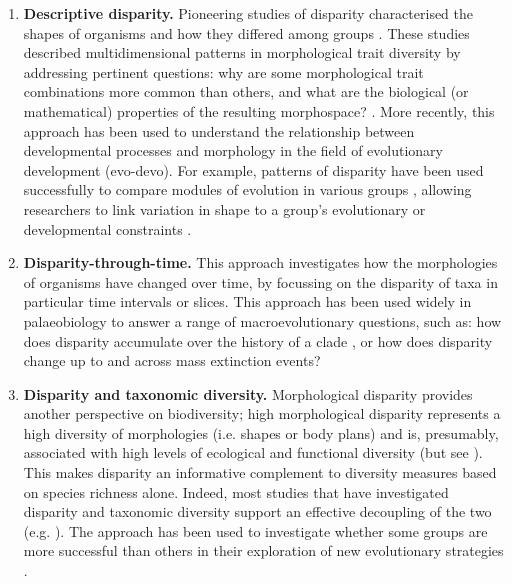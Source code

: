 \documentclass[12pt,letterpaper]{article}
\begin{document}
\begin{enumerate}

	\item \textbf{Descriptive disparity.} Pioneering studies of disparity characterised the shapes of organisms and how they differed among groups \citep{Foote1995, Briggs1992}.
	These studies described multidimensional patterns in morphological trait diversity by addressing pertinent questions: why are some morphological trait combinations more common than others, and what are the biological (or mathematical) properties of the resulting morphospace? \citep{Foote1995, Raup1961, Gerber2017}.
	More recently, this approach has been used to understand the relationship between developmental processes and morphology in the field of evolutionary development (evo-devo).
	For example, patterns of disparity have been used successfully to compare modules of evolution in various groups \citep{goswami2010influence,bardua2019morphological}, allowing researchers to link variation in shape to a group's evolutionary or developmental constraints \citep{Hipsley2017}.

	\item \textbf{Disparity-through-time.} This approach investigates how the morphologies of organisms have changed over time, by focussing on the disparity of taxa in particular time intervals or slices.
	This approach has been used widely in palaeobiology to answer a range of macroevolutionary questions, such as: how does disparity accumulate over the history of a clade \citep{prentice2011evolution, Guillerme2018}, or how does disparity change up to and across mass extinction events\citep{Friedman2010}?

	\item \textbf{Disparity and taxonomic diversity.} Morphological disparity provides another perspective on biodiversity; high morphological disparity represents a high diversity of morphologies (i.e.
	shapes or body plans) and is, presumably, associated with high levels of ecological and functional diversity (but see \citealt{anderson2012}).
	This makes disparity an informative complement to diversity measures based on species richness alone.
	Indeed, most studies that have investigated disparity and taxonomic diversity support an effective decoupling of the two (e.g. \citealt{Fortey1996, Hopkins2013}).
	The approach has been used to investigate whether some groups are more successful than others in their exploration of new evolutionary strategies \citep{pierce2008patterns}.


\end{enumerate}
\end{document}

